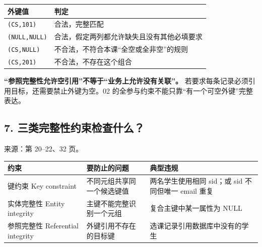 \begin{longtable}[]{@{}ll@{}}
\toprule\noalign{}
外键值 & 判定 \\
\midrule\noalign{}
\endhead
\bottomrule\noalign{}
\endlastfoot
\texttt{(\allowbreak{}CS,\allowbreak{}101)\allowbreak{}} & 合法，完整匹配 \\
\texttt{(\allowbreak{}NULL,\allowbreak{}NULL)\allowbreak{}} & 合法，假定两列都允许缺失且没有其他必填要求 \\
\texttt{(\allowbreak{}CS,\allowbreak{}NULL)\allowbreak{}} & 不合法，不符合本课``全空或全非空''的规则 \\
\texttt{(\allowbreak{}CS,\allowbreak{}201)\allowbreak{}} & 不合法，不存在这个组合 \\
\end{longtable}

\textbf{``参照完整性允许空引用''不等于``业务上允许没有关联''。} 若要求每条记录必须引用目标，还需要禁止外键为空。02 的全参与约束不能只靠``有一个可空外键''完整表达。

\subsection{7. 三类完整性约束检查什么？}\label{03_relational_model_and_integrity_zh-ux4e09ux7c7bux5b8cux6574ux6027ux7ea6ux675fux68c0ux67e5ux4ec0ux4e48}

来源：第 20--22、32 页。

\begin{longtable}[]{@{}
  >{\raggedright\arraybackslash}p{}
  >{\raggedright\arraybackslash}p{}
  >{\raggedright\arraybackslash}p{}@{}}
\toprule\noalign{}
\begin{minipage}[b]{\linewidth}\raggedright
约束
\end{minipage} & \begin{minipage}[b]{\linewidth}\raggedright
要防止的问题
\end{minipage} & \begin{minipage}[b]{\linewidth}\raggedright
典型违规
\end{minipage} \\
\midrule\noalign{}
\endhead
\bottomrule\noalign{}
\endlastfoot
键约束 Key constraint & 不同元组共享同一个候选键值 & 两名学生使用相同 sid；或 sid 不同但唯一 email 重复 \\
实体完整性 Entity integrity & 主键不能完整识别一个元组 & 复合主键中某一属性为 NULL \\
参照完整性 Referential integrity & 外键引用不存在的目标键 & 选课记录引用数据库中没有的学生 \\
\end{longtable}

